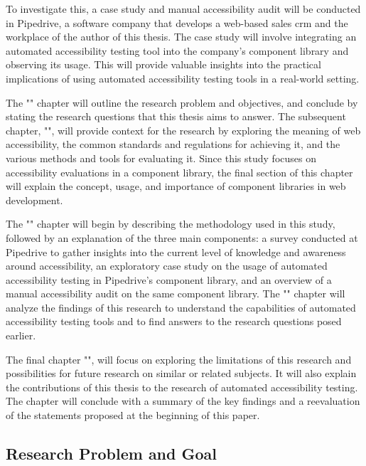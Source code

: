 \documentclass{master_thesis}
\begin{document}
To investigate this, a case study and manual accessibility audit will be conducted in Pipedrive, a software company that develops a web-based sales \ac{crm} and the workplace of the author of this thesis. The case study will involve integrating an automated accessibility testing tool into the company's component library and observing its usage. This will provide valuable insights into the practical implications of using automated accessibility testing tools in a real-world setting.


The "" chapter will outline the research problem and objectives, and conclude by stating the research questions that this thesis aims to answer. The subsequent chapter, "", will provide context for the research by exploring the meaning of web accessibility, the common standards and regulations for achieving it, and the various methods and tools for evaluating it. Since this study focuses on accessibility evaluations in a component library, the final section of this chapter will explain the concept, usage, and importance of component libraries in web development.

The "" chapter will begin by describing the methodology used in this study, followed by an explanation of the three main components: a survey conducted at Pipedrive to gather insights into the current level of knowledge and awareness around accessibility, an exploratory case study on the usage of automated accessibility testing in Pipedrive's component library, and an overview of a manual accessibility audit on the same component library. The "" chapter will analyze the findings of this research to understand the capabilities of automated accessibility testing tools and to find answers to the research questions posed earlier.

The final chapter "", will focus on exploring the limitations of this research and possibilities for future research on similar or related subjects. It will also explain the contributions of this thesis to the research of automated accessibility testing. The chapter will conclude with a summary of the key findings and a reevaluation of the statements proposed at the beginning of this paper.

\subsection{Research Problem and Goal}
\end{document}
